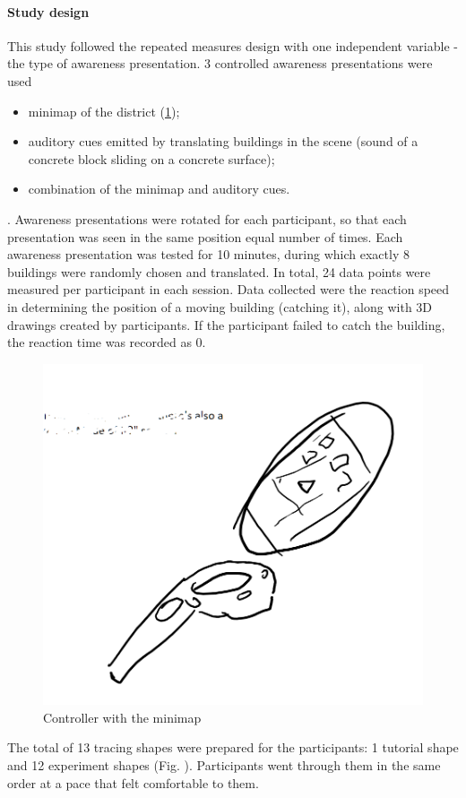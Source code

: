\paragraph{Study design}
This study followed the repeated measures design with one independent variable - the type of awareness presentation. 3 controlled awareness presentations were used
\begin{itemize}
	\item minimap of the district (\ref{fig:minimap_controller});
	\item auditory cues emitted by translating buildings in the scene (sound of a concrete block sliding on a concrete surface);
	\item combination of the minimap and auditory cues.
\end{itemize}. 
Awareness presentations were rotated for each participant, so that each presentation was seen in the same position equal number of times. 
Each awareness presentation was tested for 10 minutes, during which exactly 8 buildings were randomly chosen and translated. In total, 24 data points were measured per participant in each session. Data collected were the reaction speed in determining the position of a moving building (catching it), along with 3D drawings created by participants. If the participant failed to catch the building, the reaction time was recorded as 0.

\begin{figure}[h]
	\centering
	\includegraphics[width=0.7\linewidth]{figures/placeholders/minimap_controller}
	\caption{Controller with the minimap}
	\label{fig:minimap_controller}
\end{figure}

The total of 13 tracing shapes were prepared for the participants: 1 tutorial shape and 12 experiment shapes (Fig. ). %
Participants went through them in the same order at a pace that felt comfortable to them.

